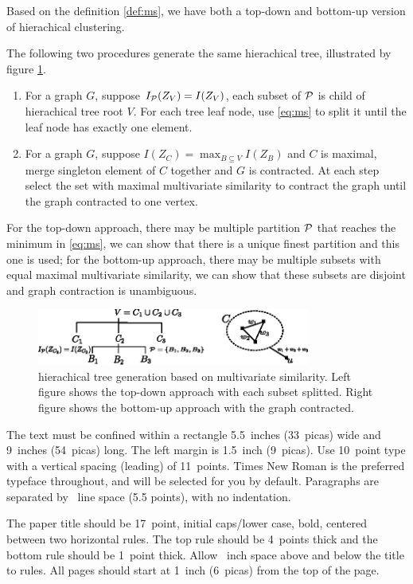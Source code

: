 \documentclass{article}
\begin{document}
Based on the definition \eqref{def:ms}, we have both a top-down and bottom-up version of hierachical clustering.
\begin{proposition}\label{prop:ta}
The following two procedures generate the same hierachical tree, illustrated by figure \ref{fig:ta}.
\begin{enumerate}
\item For a graph $G$, suppose $I_{\P}(Z_V)=I(Z_V)$, each subset of $\P$ is child of hierachical tree root $V$. For each tree leaf node, use \eqref{eq:ms} to split it until the leaf node has exactly one element.
\item For a graph $G$, suppose $I(Z_C) = \max_{B\subseteq V} I(Z_B)$ and $C$ is maximal, merge singleton element of $C$ together and $G$ is contracted. At each step select the set with maximal multivariate similarity to contract the graph until the graph contracted to one vertex.
\end{enumerate}
\end{proposition}
For the top-down approach, there may be multiple partition $\P$ that reaches the minimum in \eqref{eq:ms}, we can show that there is a unique finest partition and this one is used; for the bottom-up approach, there may be multiple subsets with equal maximal multivariate similarity, we can show that these subsets are disjoint and graph contraction is unambiguous.
\begin{figure}
\centering
\includegraphics[width=0.8\textwidth]{two_approach.eps}
\caption{hierachical tree generation based on multivariate similarity. Left figure shows the top-down approach with each subset splitted. Right figure shows the bottom-up approach with the graph contracted.}\label{fig:ta}
\end{figure}

The text must be confined within a rectangle 5.5~inches (33~picas) wide and
9~inches (54~picas) long. The left margin is 1.5~inch (9~picas).  Use 10~point
type with a vertical spacing (leading) of 11~points.  Times New Roman is the
preferred typeface throughout, and will be selected for you by default.
Paragraphs are separated by ~line space (5.5 points), with no
indentation.

The paper title should be 17~point, initial caps/lower case, bold, centered
between two horizontal rules. The top rule should be 4~points thick and the
bottom rule should be 1~point thick. Allow ~inch space above and
below the title to rules. All pages should start at 1~inch (6~picas) from the
top of the page.
\end{document}
